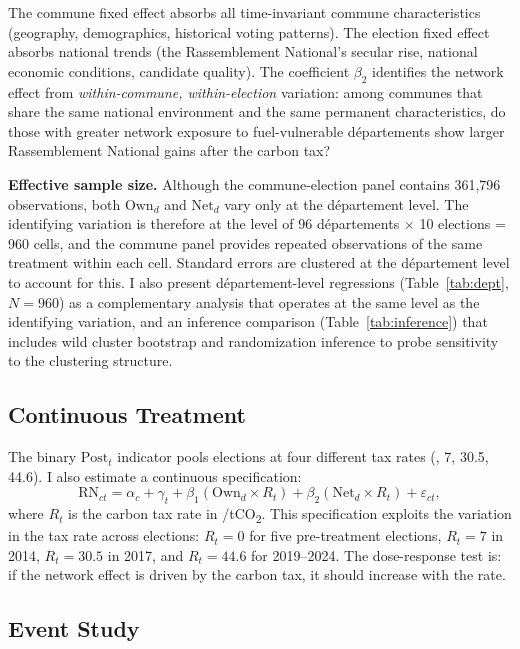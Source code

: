 \documentclass[12pt]{article}
\providecommand{\euro}{\texteuro}
\newcommand{\rn}{Rassemblement National}
\newcommand{\dept}{d\'{e}partement}
\newcommand{\depts}{d\'{e}partements}
\begin{document}
The commune fixed effect absorbs all time-invariant commune characteristics (geography, demographics, historical voting patterns). The election fixed effect absorbs national trends (the \rn{}'s secular rise, national economic conditions, candidate quality). The coefficient $\beta_2$ identifies the network effect from \emph{within-commune, within-election} variation: among communes that share the same national environment and the same permanent characteristics, do those with greater network exposure to fuel-vulnerable \depts{} show larger \rn{} gains after the carbon tax?

\textbf{Effective sample size.} Although the commune-election panel contains 361,796 observations, both $\text{Own}_d$ and $\text{Net}_d$ vary only at the \dept{} level. The identifying variation is therefore at the level of 96 \depts{} $\times$ 10 elections = 960 cells, and the commune panel provides repeated observations of the same treatment within each cell. Standard errors are clustered at the \dept{} level to account for this. I also present \dept{}-level regressions (Table~\ref{tab:dept}, $N = 960$) as a complementary analysis that operates at the same level as the identifying variation, and an inference comparison (Table~\ref{tab:inference}) that includes wild cluster bootstrap and randomization inference to probe sensitivity to the clustering structure.

\subsection{Continuous Treatment}

The binary $\text{Post}_t$ indicator pools elections at four different tax rates (\euro 0, 7, 30.5, 44.6). I also estimate a continuous specification:
\begin{equation}
\text{RN}_{ct} = \alpha_c + \gamma_t + \beta_1 (\text{Own}_d \times R_t) + \beta_2 (\text{Net}_d \times R_t) + \varepsilon_{ct},
\label{eq:continuous}
\end{equation}
where $R_t$ is the carbon tax rate in \euro/tCO\textsubscript{2}. This specification exploits the variation in the tax rate across elections: $R_t = 0$ for five pre-treatment elections, $R_t = 7$ in 2014, $R_t = 30.5$ in 2017, and $R_t = 44.6$ for 2019--2024. The dose-response test is: if the network effect is driven by the carbon tax, it should increase with the rate.

\subsection{Event Study}
\end{document}
